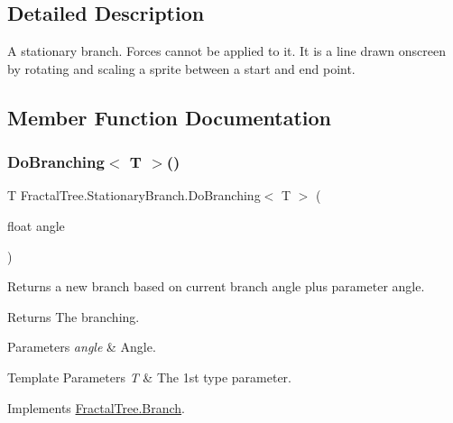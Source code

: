 \subsection{Detailed Description}
A stationary branch. Forces cannot be applied to it. It is a line drawn onscreen by rotating and scaling a sprite between a start and end point. 



\subsection{Member Function Documentation}
\hypertarget{class_fractal_tree_1_1_stationary_branch_a57ff42d0c4793c0c40aa1671905bf222}{}\label{class_fractal_tree_1_1_stationary_branch_a57ff42d0c4793c0c40aa1671905bf222} 
\subsubsection{\texorpdfstring{Do\+Branching$<$ T $>$()}{DoBranching< T >()}}
{\footnotesize\ttfamily T Fractal\+Tree.\+Stationary\+Branch.\+Do\+Branching$<$ T $>$ (\begin{DoxyParamCaption}\item[{float}]{angle }\end{DoxyParamCaption})}



Returns a new branch based on current branch angle plus parameter angle. 

\begin{DoxyReturn}{Returns}
The branching.
\end{DoxyReturn}

\begin{DoxyParams}{Parameters}
{\em angle} & Angle.\\
\hline
\end{DoxyParams}

\begin{DoxyTemplParams}{Template Parameters}
{\em T} & The 1st type parameter.\\
\hline
\end{DoxyTemplParams}


Implements \hyperlink{interface_fractal_tree_1_1_branch_ad3240d5e5d13df2ee22e55892f9c03cd}{Fractal\+Tree.\+Branch}.

